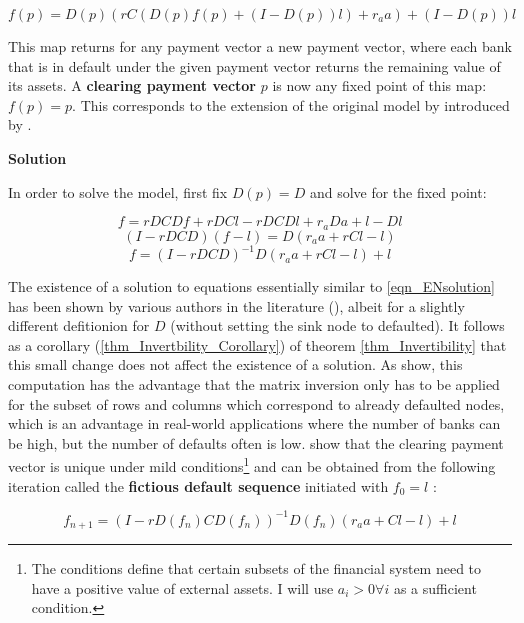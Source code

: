 \documentclass[authoryear,12pt]{elsarticle}
\begin{document}
\begin{equation}
f(p) = D(p) \left(rC\left(D\left(p\right) f\left(p\right) + \left(I - D\left(p\right)\right)l\right)+r_a a\right) + \left(I - D(p)\right) l
\end{equation}

This map returns for any payment vector a new payment vector, where each bank that is in default under the given payment vector returns the remaining value of its assets. A \textbf{clearing payment vector} $p$ is now any fixed point of this map: $f(p) = p$. This corresponds to the extension of the original model by \cite{Eisenberg2001} introduced by \cite{Rogers2013}.

\textbf{Solution}

In order to solve the model, first fix $D(p)=D$ and solve for the fixed point:

\[ f = rDCDf + rDCl - rDCDl + r_aDa + l - Dl \]
\[ (I - rDCD)(f - l) = D(r_aa + rCl - l) \]
\begin{equation} \label{eqn_ENsolution}
f = (I - rDCD)^{-1} D(r_aa + rCl - l) + l
\end{equation}

The existence of a solution to equations essentially similar to \ref{eqn_ENsolution} has been shown by various authors in the literature (\cite{Eisenberg2001,Rogers2013}), albeit for a slightly different defitionion for $D$ (without setting the sink node to defaulted). It follows as a corollary (\ref{thm_Invertbility_Corollary}) of theorem \ref{thm_Invertibility} that this small change does not affect the existence of a solution. As \cite{Elsinger2012} show, this computation has the advantage that the matrix inversion only has to be applied for the subset of rows and columns which correspond to already defaulted nodes, which is an advantage in real-world applications where the number of banks can be high, but the number of defaults often is low. \cite{Eisenberg2001} show that the clearing payment vector is unique under mild conditions\footnote{The conditions define that certain subsets of the financial system need to have a positive value of external assets. I will use $a_i>0 \forall i$ as a sufficient condition.} and can be obtained from the following iteration called the \textbf{fictious default sequence} initiated with $f_0=l$ \cite{Eisenberg2001}:

\begin{equation}
f_{n+1} = (I - rD(f_n)CD(f_n))^{-1} D(f_n) (r_aa + Cl - l) + l
\end{equation}
\end{document}
